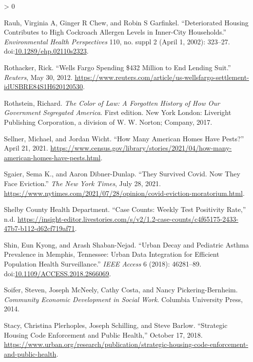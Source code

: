 \documentclass[
  openany]{book}
\newlength{\cslhangindent}
\newenvironment{CSLReferences}[2] %
 {%
  \setlength{\parindent}{0pt}
  \ifodd #1 \everypar{\setlength{\hangindent}{\cslhangindent}}\ignorespaces\fi
  \ifnum #2 > 0
  \setlength{\parskip}{#2\baselineskip}
  \fi
 }%
 {}
\begin{document}
\begin{CSLReferences}{1}{0}
\leavevmode\hypertarget{ref-rauh2002}{}%
Rauh, Virginia A, Ginger R Chew, and Robin S Garfinkel. {``Deteriorated Housing Contributes to High Cockroach Allergen Levels in Inner-City Households.''} \emph{Environmental Health Perspectives} 110, no. suppl 2 (April 1, 2002): 323--27. doi:\href{https://doi.org/10.1289/ehp.02110s2323}{10.1289/ehp.02110s2323}.

\leavevmode\hypertarget{ref-rothacker2012}{}%
Rothacker, Rick. {``Wells Fargo Spending {\$}432 Million to End Lending Suit.''} \emph{Reuters}, May 30, 2012. \url{https://www.reuters.com/article/us-wellsfargo-settlement-idUSBRE84S1H620120530}.

\leavevmode\hypertarget{ref-rothstein2017}{}%
Rothstein, Richard. \emph{The Color of Law: A Forgotten History of How Our Government Segregated America}. First edition. New York London: Liveright Publishing Corporation, a division of W. W. Norton; Company, 2017.

\leavevmode\hypertarget{ref-sellner2021}{}%
Sellner, Michael, and Jordan Wicht. {``How Many American Homes Have Pests?''} April 21, 2021. \url{https://www.census.gov/library/stories/2021/04/how-many-american-homes-have-pests.html}.

\leavevmode\hypertarget{ref-sgaier2021}{}%
Sgaier, Sema K., and Aaron Dibner-Dunlap. {``They Survived Covid. Now They Face Eviction.''} \emph{The New York Times}, July 28, 2021. \url{https://www.nytimes.com/2021/07/28/opinion/covid-eviction-moratorium.html}.

\leavevmode\hypertarget{ref-shelbycountyhealthdepartment}{}%
Shelby County Health Department. {``Case Counts: Weekly Test Positivity Rate,''} n.d. \url{https://insight-editor.livestories.com/s/v2/1.2-case-counts/c4f65175-2433-47b7-b112-d62cf719af71}.

\leavevmode\hypertarget{ref-shin2018}{}%
Shin, Eun Kyong, and Arash Shaban-Nejad. {``Urban Decay and Pediatric Asthma Prevalence in Memphis, Tennessee: Urban Data Integration for Efficient Population Health Surveillance.''} \emph{IEEE Access} 6 (2018): 46281--89. doi:\href{https://doi.org/10.1109/ACCESS.2018.2866069}{10.1109/ACCESS.2018.2866069}.

\leavevmode\hypertarget{ref-soifer2014}{}%
Soifer, Steven, Joseph McNeely, Cathy Costa, and Nancy Pickering-Bernheim. \emph{Community Economic Development in Social Work}. Columbia University Press, 2014.

\leavevmode\hypertarget{ref-stacy2018}{}%
Stacy, Christina Plerhoples, Joseph Schilling, and Steve Barlow. {``Strategic Housing Code Enforcement and Public Health,''} October 17, 2018. \url{https://www.urban.org/research/publication/strategic-housing-code-enforcement-and-public-health}.


\end{CSLReferences}
\end{document}
